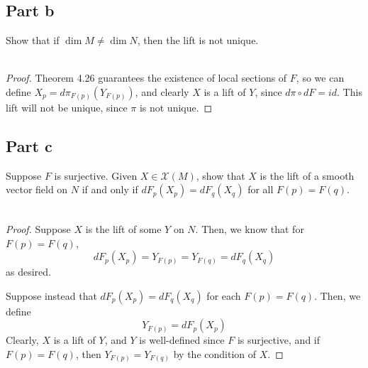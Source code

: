 \documentclass[fontsize=11pt]{scrartcl} %
\numberwithin{equation}{section} %
\numberwithin{figure}{section} %
\numberwithin{table}{section} %
\begin{document}
\subsection*{Part b}
Show that if $\dim M \neq \dim N$, then the lift is not unique.
\\
\\
\begin{proof}
    Theorem 4.26 guarantees the existence of local sections of $F$, so we can
    define $X_p = d\pi_{F(p)}(Y_{F(p)})$, and clearly $X$ is a lift of $Y$,
    since $d\pi\circ dF = id$. This lift will not be unique, since $\pi$ is not
    unique.
\end{proof}

\subsection*{Part c}
Suppose $F$ is surjective. Given $X\in\mathcal{X}(M)$, show that $X$ is the lift
of a smooth vector field on $N$ if and only if $dF_p(X_p) = dF_q(X_q)$ for all
$F(p) = F(q)$.
\\
\\
\begin{proof}
    Suppose $X$ is the lift of some $Y$ on $N$. Then, we know that for $F(p) =
    F(q)$,
    \[
        dF_p(X_p) = Y_{F(p)}=Y_{F(q)}=dF_q(X_q)
    \]
    as desired.

    Suppose instead that $dF_p(X_p)=dF_q(X_q)$ for each $F(p)=F(q)$. Then, we
    define
    \[
        Y_{F(p)} = dF_p(X_p)
    \]
    Clearly, $X$ is a lift of $Y$, and $Y$ is well-defined since $F$ is
    surjective, and if $F(p)=F(q)$, then $Y_{F(p)}=Y_{F(q)}$ by the condition of
    $X$.
\end{proof}
\end{document}
